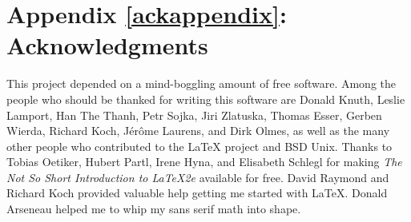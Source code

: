 \label{ackappendix}%
\appendix\chapter{Appendix \ref{ackappendix}: Acknowledgments}%

This project depended on a mind-boggling amount of free software. Among the
people who should be thanked for writing this software are Donald Knuth,
Leslie Lamport, Han The Thanh, Petr Sojka, Jiri Zlatuska, Thomas Esser,
Gerben Wierda, Richard Koch, J\'er\^ome Laurens, and Dirk Olmes, as well
as the many other people who contributed to the LaTeX project and BSD Unix.
Thanks to Tobias Oetiker, Hubert Partl, Irene Hyna, and Elisabeth Schlegl
for making \emph{The Not So Short Introduction to LaTeX2e} available for free.
David Raymond and Richard Koch provided valuable help getting me started
with LaTeX. Donald Arseneau helped me to whip my sans serif math into
shape.

